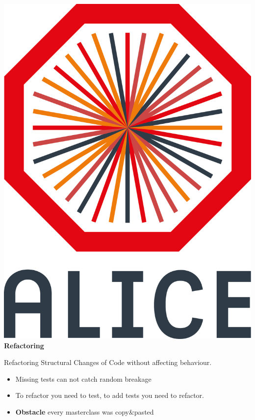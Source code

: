 \documentclass[aspectratio=169,14pt,dvipsnames]{beamer}
\begin{document}
\begin{frame}{\includegraphics[height=0.07\textheight]{2012-Jul-04-4_Color_Logo_CB.png} \hspace{0.2cm}\textbf{Refactoring}}
  \begin{block}{Refactoring}
    Structural Changes of Code without affecting behaviour.
  \end{block}

  \begin{itemize}
    \item<2> Missing tests can not catch random breakage
    \item<2> To refactor you need to test, to add tests you need to refactor.
    \item<2> \textbf{Obstacle} every masterclass was copy\&pasted
  \end{itemize}
\end{frame}
\end{document}
